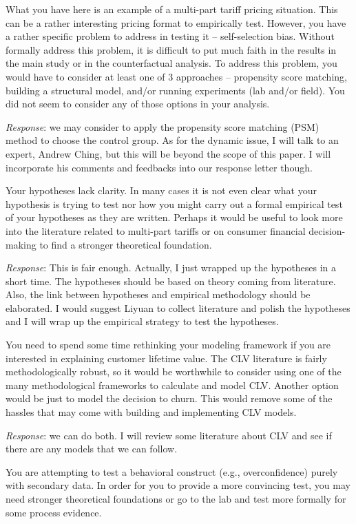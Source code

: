 \documentclass[titlepage,12pt,letterpaper]{article}
\numberwithin{equation}{section}
\begin{document}
What you have here is an example of a multi-part tariff pricing situation. This can be a rather interesting pricing format to empirically test. However, you have a rather specific problem to address in testing it – self-selection bias. Without formally address this problem, it is difficult to put much faith in the results in the main study or in the counterfactual analysis. To address this problem, you would have to consider at least one of 3 approaches – propensity score matching, building a structural model, and/or running experiments (lab and/or field). You did not seem to consider any of those options in your analysis.

\emph{Response}: we may consider to apply the propensity score matching (PSM) method to choose the control group. As for the dynamic issue, I will talk to an expert, Andrew Ching, but this will be beyond the scope of this paper. I will incorporate his comments and feedbacks into our response letter though. 

Your hypotheses lack clarity. In many cases it is not even clear what your hypothesis is trying to test nor how you might carry out a formal empirical test of your hypotheses as they are written. Perhaps it would be useful to look more into the literature related to multi-part tariffs or on consumer financial decision-making to find a stronger theoretical foundation.

\emph{Response}: This is fair enough. Actually, I just wrapped up the hypotheses in a short time. The hypotheses should be based on theory coming from literature. Also, the link between hypotheses and empirical methodology should be elaborated. I would suggest Liyuan to collect literature and polish the hypotheses and I will wrap up the empirical strategy to test the hypotheses. 

You need to spend some time rethinking your modeling framework if you are interested in explaining customer lifetime value. The CLV literature is fairly methodologically robust, so it would be worthwhile to consider using one of the many methodological frameworks to calculate and model CLV. Another option would be just to model the decision to churn. This would remove some of the hassles that may come with building and implementing CLV models.

\emph{Response}: we can do both. I will review some literature about CLV and see if there are any models that we can follow. 

You are attempting to test a behavioral construct (e.g., overconfidence) purely with secondary data. In order for you to provide a more convincing test, you may need stronger theoretical foundations or go to the lab and test more formally for some process evidence.
\end{document}
